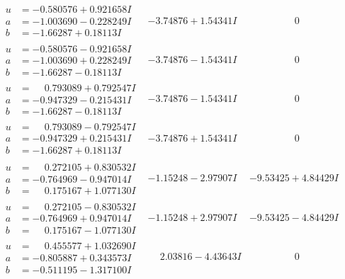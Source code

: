 \documentclass[1p]{elsarticle_modified}
\theoremstyle{definition}
\begin{document}
$$\begin{array}{c|c|c}
\begin{aligned}
u &= -0.580576 + 0.921658 I \\
a &= -1.003690 - 0.228249 I \\
b &= -1.66287 + 0.18113 I\end{aligned}
 & -3.74876 + 1.54341 I & \phantom{-0.000000 } 0 \\ \hline\begin{aligned}
u &= -0.580576 - 0.921658 I \\
a &= -1.003690 + 0.228249 I \\
b &= -1.66287 - 0.18113 I\end{aligned}
 & -3.74876 - 1.54341 I & \phantom{-0.000000 } 0 \\ \hline\begin{aligned}
u &= \phantom{-}0.793089 + 0.792547 I \\
a &= -0.947329 - 0.215431 I \\
b &= -1.66287 - 0.18113 I\end{aligned}
 & -3.74876 - 1.54341 I & \phantom{-0.000000 } 0 \\ \hline\begin{aligned}
u &= \phantom{-}0.793089 - 0.792547 I \\
a &= -0.947329 + 0.215431 I \\
b &= -1.66287 + 0.18113 I\end{aligned}
 & -3.74876 + 1.54341 I & \phantom{-0.000000 } 0 \\ \hline\begin{aligned}
u &= \phantom{-}0.272105 + 0.830532 I \\
a &= -0.764969 - 0.947014 I \\
b &= \phantom{-}0.175167 + 1.077130 I\end{aligned}
 & -1.15248 - 2.97907 I & -9.53425 + 4.84429 I \\ \hline\begin{aligned}
u &= \phantom{-}0.272105 - 0.830532 I \\
a &= -0.764969 + 0.947014 I \\
b &= \phantom{-}0.175167 - 1.077130 I\end{aligned}
 & -1.15248 + 2.97907 I & -9.53425 - 4.84429 I \\ \hline\begin{aligned}
u &= \phantom{-}0.455577 + 1.032690 I \\
a &= -0.805887 + 0.343573 I \\
b &= -0.511195 - 1.317100 I\end{aligned}
 & \phantom{-}2.03816 - 4.43643 I & \phantom{-0.000000 } 0 \\ \hline\begin{aligned}

\end{aligned}
\end{array}$$
\end{document}
